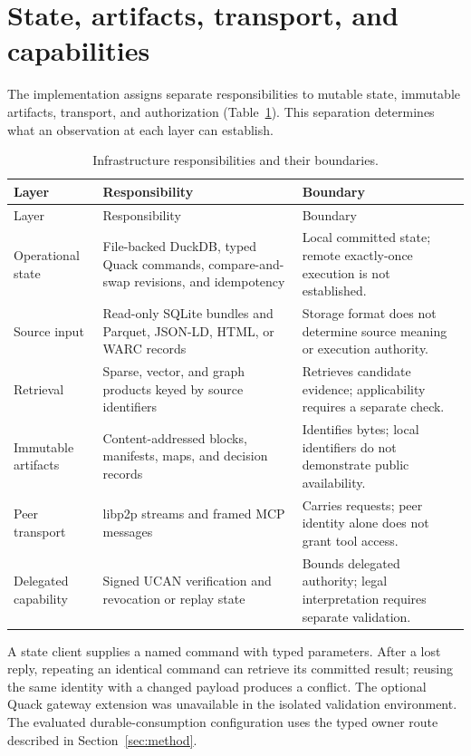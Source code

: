 \section{State, artifacts, transport, and capabilities}
\label{app:infrastructure}
\setcounter{table}{0}

The implementation assigns separate responsibilities to mutable state, immutable artifacts, transport, and authorization (Table~\ref{tab:C1}). This separation determines what an observation at each layer can establish.

\begin{longtable}{@{}>{\raggedright\arraybackslash}p{.21\linewidth} >{\raggedright\arraybackslash}p{.37\linewidth} >{\raggedright\arraybackslash}p{.36\linewidth}@{}}
\caption{Infrastructure responsibilities and their boundaries.}\label{tab:C1}\\
\toprule
Layer & Responsibility & Boundary \\
\midrule
\endfirsthead
\toprule
Layer & Responsibility & Boundary \\
\midrule
\endhead
\bottomrule
\endlastfoot
Operational state & File-backed DuckDB, typed Quack commands, compare-and-swap revisions, and idempotency & Local committed state; remote exactly-once execution is not established. \\[4pt]
Source input & Read-only SQLite bundles and Parquet, JSON-LD, HTML, or WARC records & Storage format does not determine source meaning or execution authority. \\[4pt]
Retrieval & Sparse, vector, and graph products keyed by source identifiers & Retrieves candidate evidence; applicability requires a separate check. \\[4pt]
Immutable artifacts & Content-addressed blocks, manifests, maps, and decision records \citep{ipfs} & Identifies bytes; local identifiers do not demonstrate public availability. \\[4pt]
Peer transport & libp2p streams and framed MCP messages \citep{libp2p} & Carries requests; peer identity alone does not grant tool access. \\[4pt]
Delegated capability & Signed UCAN verification and revocation or replay state \citep{ucan} & Bounds delegated authority; legal interpretation requires separate validation. \\
\end{longtable}

A state client supplies a named command with typed parameters. After a lost reply, repeating an identical command can retrieve its committed result; reusing the same identity with a changed payload produces a conflict. The optional Quack gateway extension was unavailable in the isolated validation environment. The evaluated durable-consumption configuration uses the typed owner route described in Section~\ref{sec:method}.


